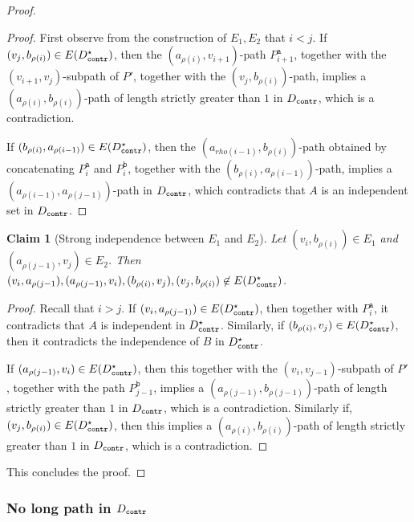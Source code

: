 \documentclass[a4paper,11pt]{article}
\theoremstyle{plain}
\newtheorem{claim}[theorem]{Claim}
\newtheorem{identification rule}{Identification Rule}
\theoremstyle{definition}
\theoremstyle{remark}
\newenvironment{claimproof}{\begin{proof}\renewcommand{\qedsymbol}{\claimqed}}{\end{proof}\renewcommand{\qedsymbol}{\plainqed}}
\let\plainqed\qedsymbol
\newcommand{\claimqed}{$\lrcorner$}
\newcommand{\contr}{\textnormal{\texttt{contr}}}
\newcommand{\Dcontr}{D_{\contr}}
\newcommand{\aaa}{\texttt{a}}
\newcommand{\bbb}{\texttt{b}}
\begin{document}
\begin{proof}
\begin{claimproof}
First observe from the construction of $E_1,E_2$ that $i <j$.
If $(v_j,b_{\rho(i)}) \in E(\Dcontr^{\star})$, then the $(a_{\rho(i)},v_{i+1})$-path $P^{\aaa}_{i+1}$, together with the $(v_{i+1},v_j)$-subpath of $P'$, together with the $(v_j,b_{\rho(i)})$-path, implies a $(a_{\rho(i)},b_{\rho(i)})$-path of length strictly greater than $1$ in $\Dcontr$, which is a contradiction. 

If $(b_{\rho(i)},a_{\rho(i-1)})  \in E(\Dcontr^{\star})$, then the $(a_{rho(i-1)},b_{\rho(i)})$-path obtained by concatenating $P^{\aaa}_i$ and $P^{\bbb}_i$, together with the $(b_{\rho(i)},a_{\rho(i-1)})$-path, implies a $(a_{\rho(i-1)},a_{\rho(j-1)})$-path in $\Dcontr$, which contradicts that $A$ is an independent set in $\Dcontr$.
\end{claimproof}

\begin{claim}[Strong independence between $E_1$ and $E_2$]\label{claim:biclique-long-path-strong}
Let $(v_i,b_{\rho(i)}) \in E_1$ and $(a_{\rho(j-1)},v_j) \in E_2$.
Then $(v_i,a_{\rho(j-1}), \allowbreak (a_{\rho(j-1)},v_i), \allowbreak (b_{\rho(i)},v_j), \allowbreak (v_j,b_{\rho(i)}) \not \in E(\Dcontr^{\star})$.
\end{claim}

\begin{claimproof}
Recall that $i >j$.
If $(v_i,a_{\rho(j-1)}) \in E(\Dcontr^{\star})$, then together with $P^{\aaa}_i$, it contradicts that $A$ is independent in $\Dcontr^{\star}$. Similarly, if $(b_{\rho(i)},v_j) \in E(\Dcontr^{\star})$, then it contradicts the independence of $B$ in $\Dcontr^{\star}$.

If $(a_{\rho(j-1)},v_i) \in E(\Dcontr^{\star})$, then this together with the $(v_i,v_{j-1})$-subpath of $P'$, together with the path $P^{\bbb}_{j-1}$, implies a $(a_{\rho(j-1)},b_{\rho(j-1)})$-path of length strictly greater than $1$ in $\Dcontr$, which is a contradiction. Similarly if, $(v_j,b_{\rho(i)}) \in E(\Dcontr^{\star})$, then this implies a $(a_{\rho(i)},b_{\rho(i)})$-path of length strictly greater than $1$ in $\Dcontr$, which is a contradiction.
\end{claimproof}
This concludes the proof.
\end{proof}

\subsubsection{No long path in $\Dcontr$}\label{sec:biclique:nolongpath}
\end{document}
